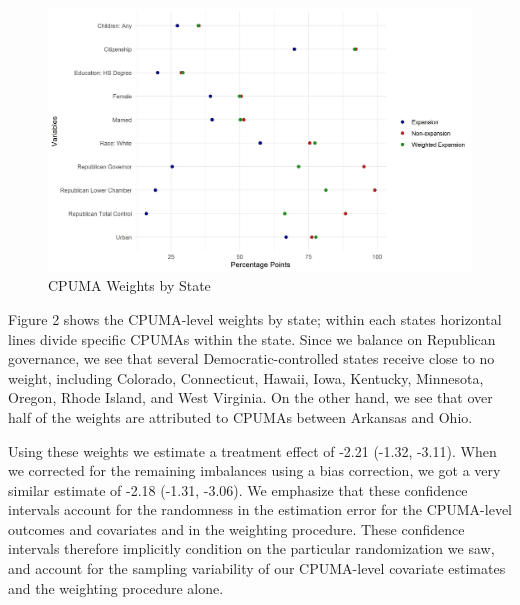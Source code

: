 \documentclass[12pt]{article}
\begin{document}
\begin{figure}
    \includegraphics[bb=0]{images/balance-plot-largest10-unweighted.jpeg}
    \caption{CPUMA Weights by State}
\end{figure}


Figure 2 shows the CPUMA-level weights by state; within each states horizontal lines divide specific CPUMAs within the state. Since we balance on Republican governance, we see that several Democratic-controlled states receive close to no weight, including Colorado, Connecticut, Hawaii, Iowa, Kentucky, Minnesota, Oregon, Rhode Island, and West Virginia. On the other hand, we see that over half of the weights are attributed to CPUMAs between Arkansas and Ohio.


Using these weights we estimate a treatment effect of -2.21 (-1.32, -3.11). When we corrected for the remaining imbalances using a bias correction, we got a very similar estimate of  -2.18 (-1.31, -3.06). We emphasize that these confidence intervals account for the randomness in the estimation error for the CPUMA-level outcomes and covariates and in the weighting procedure. These confidence intervals therefore implicitly condition on the particular randomization we saw, and account for the sampling variability of our CPUMA-level covariate estimates and the weighting procedure alone. 

\end{document}
